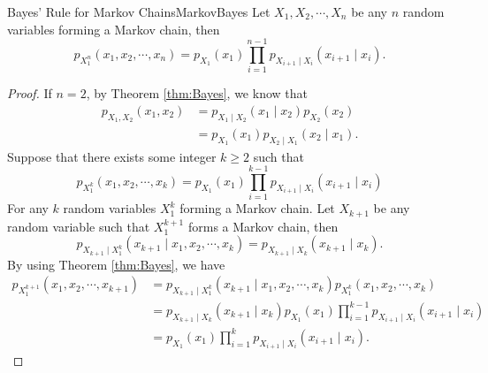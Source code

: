 \documentclass[math, code]{amznotes}
\theoremstyle{remark}
\begin{document}
\begin{corbox}{Bayes' Rule for Markov Chains}{MarkovBayes}
    Let $X_1, X_2, \cdots, X_n$ be any $n$ random variables forming a Markov chain, then 
    \begin{equation*}
        p_{X_1^n}\left(x_1, x_2, \cdots, x_n\right) = p_{X_1}\left(x_1\right)\prod_{i = 1}^{n - 1}p_{X_{i + 1} \mid X_i}\left(x_{i + 1} \mid x_i\right).
    \end{equation*}
    \tcblower
    \begin{proof}
        If $n = 2$, by Theorem \ref{thm:Bayes}, we know that 
        \begin{align*}
            p_{X_1, X_2}\left(x_1, x_2\right) & = p_{X_1 \mid X_2}\left(x_1 \mid x_2\right)p_{X_2}\left(x_2\right) \\
            & = p_{X_1}\left(x_1\right)p_{X_2 \mid X_1}\left(x_2 \mid x_1\right).
        \end{align*}
        Suppose that there exists some integer $k \geq 2$ such that 
        \begin{equation*}
            p_{X_1^k}\left(x_1, x_2, \cdots, x_k\right) = p_{X_1}\left(x_1\right)\prod_{i = 1}^{k - 1}p_{X_{i + 1} \mid X_i}\left(x_{i + 1} \mid x_i\right)
        \end{equation*}
        For any $k$ random variables $X_1^k$ forming a Markov chain. Let $X_{k + 1}$ be any random variable such that $X_1^{k + 1}$ forms a Markov chain, then 
        \begin{equation*}
            p_{X_{k + 1} \mid X_1^{k}}\left(x_{k + 1} \mid x_1, x_2, \cdots, x_k\right) = p_{X_{k + 1} \mid X_k}\left(x_{k + 1} \mid x_k\right).
        \end{equation*}
        By using Theorem \ref{thm:Bayes}, we have
        \begin{align*}
            p_{X_1^{k + 1}}\left(x_1, x_2, \cdots, x_{k + 1}\right) & = p_{X_{k + 1} \mid X_1^{k}}\left(x_{k + 1} \mid x_1, x_2, \cdots, x_k\right)p_{X_1^k}\left(x_1, x_2, \cdots, x_k\right) \\
            & = p_{X_{k + 1} \mid X_k}\left(x_{k + 1} \mid x_k\right)p_{X_1}\left(x_1\right)\prod_{i = 1}^{k - 1}p_{X_{i + 1} \mid X_i}\left(x_{i + 1} \mid x_i\right) \\
            & = p_{X_1}\left(x_1\right)\prod_{i = 1}^{k}p_{X_{i + 1} \mid X_i}\left(x_{i + 1} \mid x_i\right).
        \end{align*}
    \end{proof}
\end{corbox}
\end{document}
